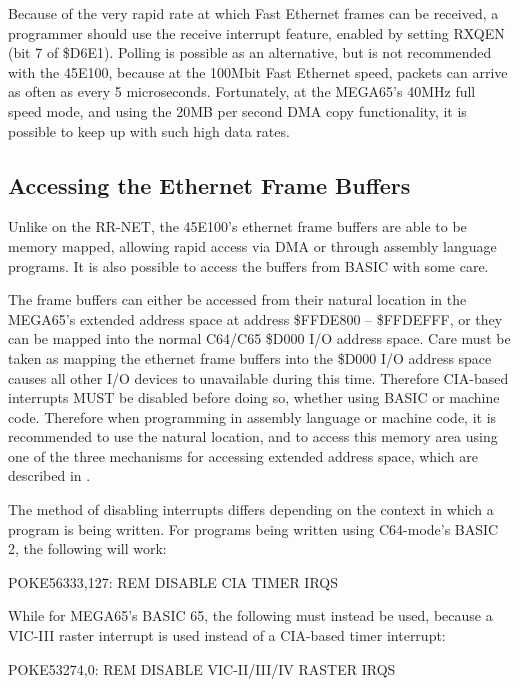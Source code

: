 Because of the very rapid rate at which Fast Ethernet frames can be received, a programmer should use the
receive interrupt feature, enabled by setting RXQEN (bit 7 of \$D6E1).  Polling is possible as an alternative, but
is not recommended with the 45E100, because at the 100Mbit Fast Ethernet speed, packets can arrive
as often as every 5 microseconds.  Fortunately, at the MEGA65's 40MHz full speed mode, and using
the 20MB per second DMA copy functionality, it is possible to keep up with such high data rates.

\subsection{Accessing the Ethernet Frame Buffers}

Unlike on the RR-NET, the 45E100's ethernet frame buffers are able to be memory mapped, allowing rapid access via DMA
or through assembly language programs.  It is also possible to access the buffers from BASIC with some care.

The frame buffers can either be accessed from their natural location in the MEGA65's extended address space at address
\$FFDE800 -- \$FFDEFFF, or they can be mapped into the normal C64/C65 \$D000 I/O address space.  Care must be
taken as mapping the ethernet frame buffers into the \$D000 I/O address space causes all other I/O devices to unavailable
during this time.  Therefore CIA-based interrupts MUST be disabled before doing so, whether using BASIC or machine code.  Therefore
when programming in assembly language or machine code, it is recommended to use the natural location, and to access this
memory area using one of the three mechanisms for accessing extended address space, which are described in .

The method of
disabling interrupts differs depending on the context in which a program is being written. For programs being written using C64-mode's BASIC 2, the following will work:

\begin{screencode}
  POKE56333,127: REM DISABLE CIA TIMER IRQS
\end{screencode}

While for MEGA65's BASIC 65, the following must instead be used, because a VIC-III raster interrupt is used instead of a CIA-based timer interrupt:

\begin{screencode}
POKE53274,0: REM DISABLE VIC-II/III/IV RASTER IRQS
\end{screencode}

